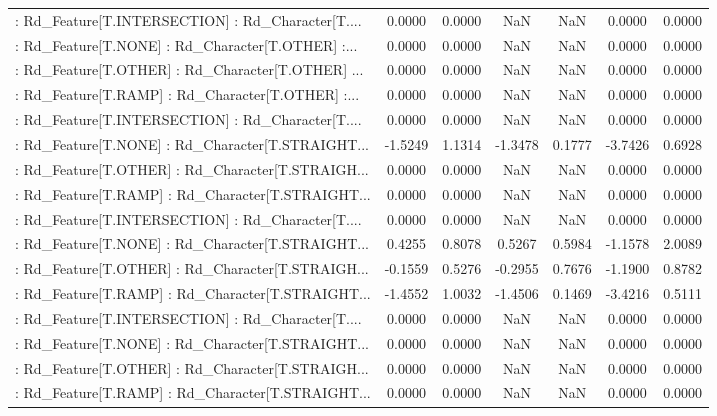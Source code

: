 \begin{longtable}{p{4cm}cccccc}
 : Rd\_Feature[T.INTERSECTION] : Rd\_Character[T.... &  0.0000 &    0.0000 &     NaN &          NaN &  0.0000 &  0.0000 \\
 : Rd\_Feature[T.NONE] : Rd\_Character[T.OTHER] :... &  0.0000 &    0.0000 &     NaN &          NaN &  0.0000 &  0.0000 \\
 : Rd\_Feature[T.OTHER] : Rd\_Character[T.OTHER] ... &  0.0000 &    0.0000 &     NaN &          NaN &  0.0000 &  0.0000 \\
 : Rd\_Feature[T.RAMP] : Rd\_Character[T.OTHER] :... &  0.0000 &    0.0000 &     NaN &          NaN &  0.0000 &  0.0000 \\
 : Rd\_Feature[T.INTERSECTION] : Rd\_Character[T.... &  0.0000 &    0.0000 &     NaN &          NaN &  0.0000 &  0.0000 \\
 : Rd\_Feature[T.NONE] : Rd\_Character[T.STRAIGHT... & -1.5249 &    1.1314 & -1.3478 &       0.1777 & -3.7426 &  0.6928 \\
 : Rd\_Feature[T.OTHER] : Rd\_Character[T.STRAIGH... &  0.0000 &    0.0000 &     NaN &          NaN &  0.0000 &  0.0000 \\
 : Rd\_Feature[T.RAMP] : Rd\_Character[T.STRAIGHT... &  0.0000 &    0.0000 &     NaN &          NaN &  0.0000 &  0.0000 \\
 : Rd\_Feature[T.INTERSECTION] : Rd\_Character[T.... &  0.0000 &    0.0000 &     NaN &          NaN &  0.0000 &  0.0000 \\
 : Rd\_Feature[T.NONE] : Rd\_Character[T.STRAIGHT... &  0.4255 &    0.8078 &  0.5267 &       0.5984 & -1.1578 &  2.0089 \\
 : Rd\_Feature[T.OTHER] : Rd\_Character[T.STRAIGH... & -0.1559 &    0.5276 & -0.2955 &       0.7676 & -1.1900 &  0.8782 \\
 : Rd\_Feature[T.RAMP] : Rd\_Character[T.STRAIGHT... & -1.4552 &    1.0032 & -1.4506 &       0.1469 & -3.4216 &  0.5111 \\
 : Rd\_Feature[T.INTERSECTION] : Rd\_Character[T.... &  0.0000 &    0.0000 &     NaN &          NaN &  0.0000 &  0.0000 \\
 : Rd\_Feature[T.NONE] : Rd\_Character[T.STRAIGHT... &  0.0000 &    0.0000 &     NaN &          NaN &  0.0000 &  0.0000 \\
 : Rd\_Feature[T.OTHER] : Rd\_Character[T.STRAIGH... &  0.0000 &    0.0000 &     NaN &          NaN &  0.0000 &  0.0000 \\
 : Rd\_Feature[T.RAMP] : Rd\_Character[T.STRAIGHT... &  0.0000 &    0.0000 &     NaN &          NaN &  0.0000 &  0.0000 \\

\end{longtable}
